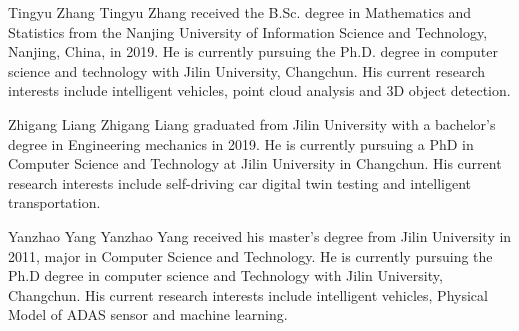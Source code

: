 \documentclass[journal]{IEEEtran}
\begin{document}

	
	\begin{IEEEbiography}{Tingyu Zhang}
		Tingyu Zhang received the B.Sc. degree in Mathematics and Statistics from the Nanjing University of Information Science and Technology, Nanjing, China,
		in 2019. He is currently pursuing the Ph.D. degree
		in computer science and technology with Jilin University,
		Changchun. His current research interests
		include intelligent vehicles, point cloud analysis and 3D object detection.\end{IEEEbiography}
	
	\begin{IEEEbiography}{Zhigang Liang}
		Zhigang Liang graduated from Jilin University with a bachelor's degree in Engineering mechanics in 2019. He is currently pursuing a PhD in Computer Science and Technology at Jilin University in Changchun. His current research interests include self-driving car digital twin testing and intelligent transportation.\end{IEEEbiography}
	
	\begin{IEEEbiography}{Yanzhao Yang}
		Yanzhao Yang received his master's degree from Jilin University in 2011, major in Computer Science and Technology. He is currently pursuing the Ph.D degree in computer science and Technology with Jilin University, Changchun. His current research interests include intelligent vehicles, Physical Model of ADAS sensor and machine learning.\end{IEEEbiography}
	
\end{document}
